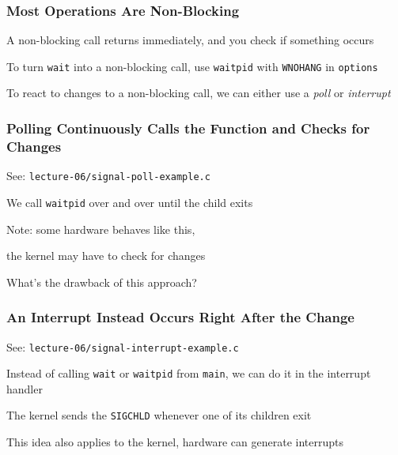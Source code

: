   \begin{frame}
    \frametitle{Most Operations Are Non-Blocking}

    A non-blocking call returns immediately, and you check if something occurs

    \vspace{2em}

    To turn \texttt{wait} into a non-blocking call, use \texttt{waitpid} with
    \texttt{WNOHANG} in \texttt{options}

    \vspace{2em}

    To react to changes to a non-blocking call, we can either use a
    \textit{poll} or \textit{interrupt}
  \end{frame}

  \begin{frame}
    \frametitle{Polling Continuously Calls the Function and Checks for Changes}

    See: \texttt{lecture-06/signal-poll-example.c}

    \vspace{2em}

    We call \texttt{waitpid} over and over until the child exits

    \hspace{2em} Note: some hardware behaves like this,
    
    \hspace{5em} the kernel may have to check for changes

    \vspace{2em}

    What's the drawback of this approach?

  \end{frame}

  \begin{frame}
    \frametitle{An Interrupt Instead Occurs Right After the Change}

    See: \texttt{lecture-06/signal-interrupt-example.c}

    \vspace{2em}

    Instead of calling \texttt{wait} or \texttt{waitpid} from \texttt{main},
    we can do it in the interrupt handler

    \hspace{2em} The kernel sends the \texttt{SIGCHLD} whenever one of its
                 children exit

    \vspace{2em}

    This idea also applies to the kernel, hardware can generate interrupts
  \end{frame}

